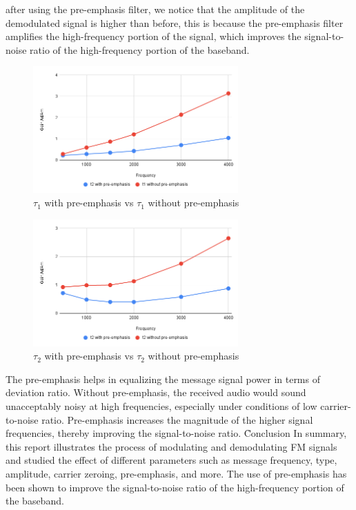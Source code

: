 \documentclass[12pt]{article}
\begin{document}
after using the pre-emphasis filter, we notice that the amplitude of the demodulated signal is higher than before, this is because the pre-emphasis filter amplifies the high-frequency portion of the signal, which improves the signal-to-noise ratio of the high-frequency portion of the baseband.
\begin{figure}[H]
    \centering
    \includegraphics[width=0.7\textwidth]{assets/ch.png}
    \caption{$\tau_1$ with pre-emphasis vs $\tau_1$ without pre-emphasis}
\end{figure}
\begin{figure}[H]
    \centering
    \includegraphics[width=0.7\textwidth]{assets/chart_5.png}
    \caption{$\tau_2$ with pre-emphasis vs $\tau_2$ without pre-emphasis}
\end{figure}
The pre-emphasis helps in equalizing the message signal power in terms of deviation ratio. Without pre-emphasis, the received audio would sound unacceptably noisy at high frequencies, especially under conditions of low carrier-to-noise ratio. Pre-emphasis increases the magnitude of the higher signal frequencies, thereby improving the signal-to-noise ratio.
\clearpage
\h{Conclusion}
In summary, this report illustrates the process of modulating and demodulating FM signals and studied the effect of different parameters such as message frequency, type, amplitude, carrier zeroing, pre-emphasis, and more. The use of pre-emphasis has been shown to improve the signal-to-noise ratio of the high-frequency portion of the baseband.
\clearpage
{}
\end{document}
